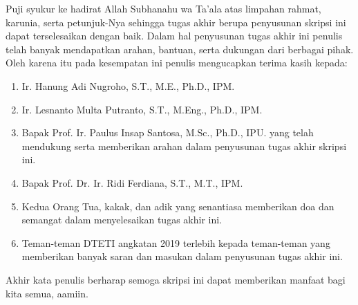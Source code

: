 \begin{center}

\end{center}

Puji syukur ke hadirat Allah Subhanahu wa Ta'ala atas limpahan rahmat, karunia, 
serta petunjuk-Nya sehingga tugas akhir berupa penyusunan skripsi ini dapat 
terselesaikan dengan baik. Dalam hal penyusunan tugas akhir ini penulis telah 
banyak mendapatkan arahan, bantuan, serta dukungan dari berbagai pihak. Oleh 
karena itu pada kesempatan ini penulis mengucapkan terima kasih kepada:

\begin{enumerate}
	\item Ir. Hanung Adi Nugroho, S.T., M.E., Ph.D., IPM.
	
	\item Ir. Lesnanto Multa Putranto, S.T., M.Eng., Ph.D., IPM.
	
	\item Bapak Prof. Ir. Paulus Insap Santosa, M.Sc., Ph.D., IPU. yang telah
	mendukung serta memberikan arahan dalam penyusunan tugas akhir skripsi ini.
	
	\item Bapak Prof. Dr. Ir. Ridi Ferdiana, S.T., M.T., IPM.
	
	\item Kedua Orang Tua, kakak, dan adik yang senantiasa memberikan doa dan semangat 
	dalam menyelesaikan tugas akhir ini. 
	
	\item Teman-teman DTETI angkatan 2019 terlebih kepada teman-teman yang 
	memberikan banyak saran dan masukan dalam penyusunan tugas akhir ini.

\end{enumerate}

Akhir kata penulis berharap semoga skripsi ini dapat memberikan manfaat bagi 
kita semua, aamiin.

